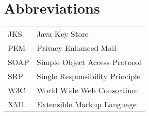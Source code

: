 
\chapter*{Abbreviations}

\begin{tabular}{p{20mm}p{120mm}}

  JKS & Java Key Store \\
  PEM & Privacy Enhanced Mail \\
  SOAP & Simple Object Access Protocol \\
  SRP & Single Responsibility Principle \\
  W3C & World Wide Web Consortium \\
  XML & Extensible Markup Language \\

\end{tabular}
